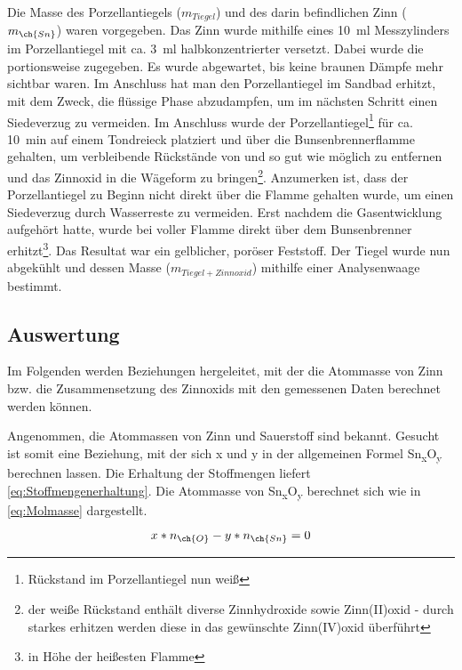 \documentclass{article}
\begin{document}
      Die Masse des Porzellantiegels ($m_{Tiegel}$) und des darin befindlichen Zinn ($m_{\ch{Sn}}$) waren vorgegeben. Das Zinn wurde mithilfe eines \SI[mode=text]{10}{\milli\litre} Messzylinders im Porzellantiegel mit ca. \SI[mode=text]{3}{\milli\litre} halbkonzentrierter  versetzt. Dabei wurde die  portionsweise zugegeben. Es wurde abgewartet, bis keine braunen Dämpfe mehr sichtbar waren. Im Anschluss hat man den Porzellantiegel im Sandbad erhitzt, mit dem Zweck, die flüssige Phase abzudampfen, um im nächsten Schritt einen Siedeverzug zu vermeiden. Im Anschluss wurde der Porzellantiegel\footnote{Rückstand im Porzellantiegel nun weiß} für ca. \SI[mode=text]{10}{\minute} auf einem Tondreieck platziert und über die Bunsenbrennerflamme gehalten, um verbleibende Rückstände von  und  so gut wie möglich zu entfernen und das Zinnoxid in die Wägeform zu bringen\footnote{der weiße Rückstand enthält diverse Zinnhydroxide sowie Zinn(II)oxid - durch starkes erhitzen werden diese in das gewünschte Zinn(IV)oxid überführt}. Anzumerken ist, dass der Porzellantiegel zu Beginn nicht direkt über die Flamme gehalten wurde, um einen Siedeverzug durch Wasserreste zu vermeiden. Erst nachdem die Gasentwicklung aufgehört hatte, wurde  bei voller Flamme direkt über dem Bunsenbrenner erhitzt\footnote{in Höhe der heißesten Flamme}. Das Resultat war ein gelblicher, poröser Feststoff. Der Tiegel wurde nun abgekühlt und dessen Masse ($m_{Tiegel+Zinnoxid}$) mithilfe einer Analysenwaage bestimmt.
    
    \pagebreak
     
    \subsection{Auswertung} \label{sec:Auswertung}
      
      Im Folgenden werden Beziehungen hergeleitet, mit der die Atommasse von Zinn bzw. die Zusammensetzung des Zinnoxids mit den gemessenen Daten berechnet werden können. 
      
      Angenommen, die Atommassen von Zinn und Sauerstoff sind bekannt. Gesucht ist somit eine Beziehung, mit der sich x und y in der allgemeinen Formel Sn\textsubscript{x}O\textsubscript{y} berechnen lassen. Die Erhaltung der Stoffmengen liefert \eqref{eq:Stoffmengenerhaltung}. Die Atommasse von Sn\textsubscript{x}O\textsubscript{y} berechnet sich wie in \eqref{eq:Molmasse} dargestellt.
    
      \begin{equation}
        x * n_{\ch{O}} - y * n_{\ch{Sn}} = 0 \label{eq:Stoffmengenerhaltung} 
      \end{equation}
      
\end{document}
